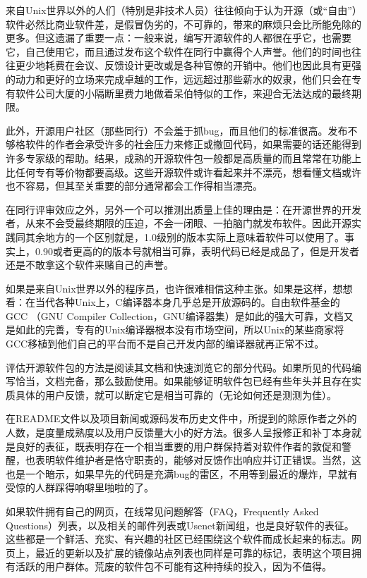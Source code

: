 \documentclass[12pt,oneside]{ctexbook}
\begin{document}
\begin{common-format}
来自Unix世界以外的人们（特别是非技术人员）往往倾向于认为开源（或“自由”）软件必然比商业软件差，是假冒伪劣的，不可靠的，带来的麻烦只会比所能免除的更多。但这遗漏了重要一点：一般来说，编写开源软件的人都很在乎它，也需要它，自己使用它，而且通过发布这个软件在同行中赢得个人声誉。他们的时间也往往更少地耗费在会议、反馈设计更改或是各种官僚的开销中。他们也因此具有更强的动力和更好的立场来完成卓越的工作，远远超过那些薪水的奴隶，他们只会在专有软件公司大厦的小隔断里费力地做着呆伯特似的工作，来迎合无法达成的最终期限。

此外，开源用户社区（那些同行）不会羞于抓bug，而且他们的标准很高。发布不够格软件的作者会承受许多的社会压力来修正或撤回代码，如果需要的话还能得到许多专家级的帮助。结果，成熟的开源软件包一般都是高质量的而且常常在功能上比任何专有等价物都要高级。这些开源软件或许看起来并不漂亮，想看懂文档或许也不容易，但其至关重要的部分通常都会工作得相当漂亮。

在同行评审效应之外，另外一个可以推测出质量上佳的理由是：在开源世界的开发者，从来不会受最终期限的压迫，不会一闭眼、一拍脑门就发布软件。因此开源实践同其余地方的一个区别就是，1.0级别的版本实际上意味着软件可以使用了。事实上，0.90或者更高的的版本号就相当可靠，表明代码已经是成品了，但是开发者还是不敢拿这个软件来赌自己的声誉。

如果是来自Unix世界以外的程序员，也许很难相信这种主张。如果是这样，想想看：在当代各种Unix上，C编译器本身几乎总是开放源码的。自由软件基金的GCC （GNU Compiler Collection，GNU编译器集）是如此的强大可靠，文档又是如此的完善，专有的Unix编译器根本没有市场空间，所以Unix的某些商家将GCC移植到他们自己的平台而不是自己开发内部的编译器就再正常不过。

评估开源软件包的方法是阅读其文档和快速浏览它的部分代码。如果所见的代码编写恰当，文档完备，那么鼓励使用。如果能够证明软件包已经有些年头并且存在实质具体的用户反馈，就可以断定它是相当可靠的（无论如何还是测测为佳）。

在README文件以及项目新闻或源码发布历史文件中，所提到的除原作者之外的人数，是度量成熟度以及用户反馈量大小的好方法。很多人呈报修正和补丁本身就是良好的表征，既表明存在一个相当重要的用户群保持着对软件作者的敦促和警醒，也表明软件维护者是恪守职责的，能够对反馈作出响应并订正错误。当然，这也是一个暗示，如果早先的代码是充满bug的雷区，不用等到最近的爆炸，早就有受惊的人群踩得响噼里啪啦的了。

如果软件拥有自己的网页，在线常见问题解答（FAQ，Frequently Asked Questions）列表，以及相关的邮件列表或Usenet新闻组，也是良好软件的表征。这些都是一个鲜活、充实、有兴趣的社区已经围绕这个软件而成长起来的标志。网页上，最近的更新以及扩展的镜像站点列表也同样是可靠的标记，表明这个项目拥有活跃的用户群体。荒废的软件包不可能有这种持续的投入，因为不值得。


\end{common-format}
\end{document}
